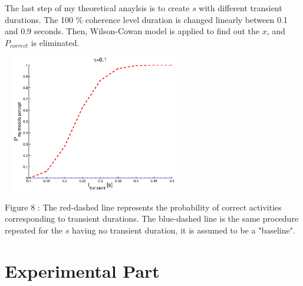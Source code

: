 \documentclass[twocolumn]{article}
\begin{document}
The last step of my theoretical anaylsis is to create $s$ with different transient durations. The 100 \% coherence level duration is changed linearly between 0.1 and 0.9 seconds. Then, Wilson-Cowan model is applied to find out the $x$, and $P_{correct}$ is eliminated.

 \begin{center}
\includegraphics[width=80mm,height=60mm]{my_P_correct.eps} 
   \begin{footnotesize} Figure 8 : The red-dashed line represents the probability of correct activities corresponding to transient durations. The blue-dashed line is the same procedure repeated for the $s$ having no transient duration, it is assumed to be a "baseline".  \end{footnotesize}
\end{center}

\section{Experimental Part}
\end{document}

